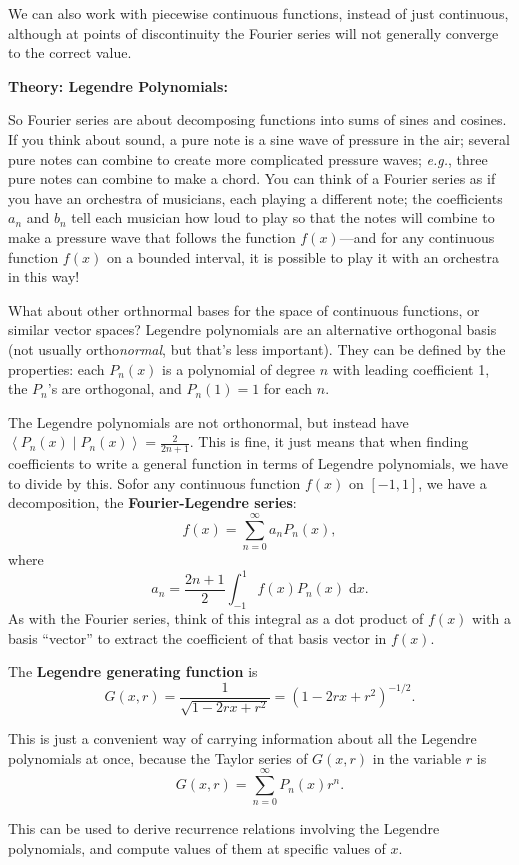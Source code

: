 \documentclass{article}
\newcommand{\diff}{\;\mathrm{d}}
\newcommand{\braket}[2]{\left\langle #1 \mid #2 \right\rangle}
\begin{document}
We can also work with piecewise continuous functions, instead of just continuous, although at points of discontinuity the Fourier series will not generally converge to the correct value.


\clearpage


\textbf{Theory: Legendre Polynomials:}\bigskip

So Fourier series are about decomposing functions into sums of sines and cosines. If you think about sound, a pure note is a sine wave of pressure in the air; several pure notes can combine to create more complicated pressure waves; \textit{e.g.}, three pure notes can combine to make a chord. You can think of a Fourier series as if you have an orchestra of musicians, each playing a different note; the coefficients $a_n$ and $b_n$ tell each musician how loud to play so that the notes will combine to make a pressure wave that follows the function $f(x)$---and for any continuous function $f(x)$ on a bounded interval, it is possible to play it with an orchestra in this way!\medskip

What about other orthnormal bases for the space of continuous functions, or similar vector spaces? Legendre polynomials are an alternative orthogonal basis (not usually ortho{\textit{normal}}, but that's less important). They can be defined by the properties: each $P_n(x)$ is a polynomial of degree $n$ with leading coefficient 1, the $P_n$'s are orthogonal, and $P_n(1)=1$ for each $n$.

The Legendre polynomials are not orthonormal, but instead have $\braket{P_n(x)}{P_n(x)}=\frac{2}{2n+1}$. This is fine, it just means that when finding coefficients to write a general function in terms of Legendre polynomials, we have to divide by this. Sofor any continuous function $f(x)$ on $[-1,1]$, we have a decomposition, the \textbf{Fourier-Legendre series}:
\[f(x)=\sum_{n=0}^\infty a_nP_n(x),\]
where
\[a_n=\frac{2n+1}{2}\int_{-1}^1 f(x)P_n(x)\diff x.\]
As with the Fourier series, think of this integral as a dot product of $f(x)$ with a basis ``vector'' to extract the coefficient of that basis vector in $f(x)$.\bigskip


The \textbf{Legendre generating function} is
\[G(x,r)=\frac{1}{\sqrt{1-2rx+r^2}}=\left(1-2rx+r^2\right)^{-1/2}.\]

This is just a convenient way of carrying information about all the Legendre polynomials at once, because the Taylor series of $G(x,r)$ in the variable $r$ is
\[G(x,r)=\sum_{n=0}^\infty P_n(x)r^n.\]

This can be used to derive recurrence relations involving the Legendre polynomials, and compute values of them at specific values of $x$.
\end{document}
